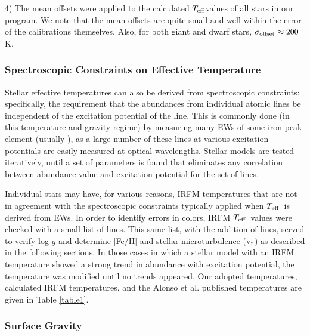 \documentclass[12pt,preprint]{aastex}
\def\teff{\mbox{$T_{\rm {eff}}$}}
\def\vt{\mbox{v$_{\rm t}$}}
\begin{document}
4) The mean offsets were applied to the calculated \teff values of all stars in our program.  We note that the mean offsets are quite small and well within the error of the calibrations themselves.  Also, for both giant and dwarf stars, $\sigma_{\rm{offset}} \approx 200$K.

\subsubsection{Spectroscopic Constraints on Effective Temperature}

Stellar effective temperatures can also be derived from spectroscopic constraints: specifically, the requirement that the abundances  from individual atomic lines be independent of the excitation potential of the line.  This is commonly done  (in this temperature and gravity regime) by measuring many EWs of  some iron peak element (usually ),  as a large number of these  lines at various excitation potentials are easily measured at optical wavelengths.  Stellar models are tested iteratively, until a set of parameters is found that eliminates any correlation between abundance value and excitation potential for the set of lines.  

Individual stars may have, for various reasons, IRFM temperatures that are not in agreement  with the spectroscopic constraints typically applied when \teff~is derived from EWs.  In order to identify errors in colors, IRFM \teff~values were checked with a small list of   lines.  This same list, with the addition of  lines, served to verify log $g$ and determine [Fe/H] and stellar microturbulence (\vt) as described in the following sections.  In those cases in which a stellar model with an IRFM temperature showed a strong trend in  abundance with excitation potential, the temperature was modified until no trends appeared.  Our adopted temperatures, calculated IRFM temperatures, and the Alonso et al. published temperatures are given in Table \ref{table1}.

\subsubsection{Surface Gravity \label{logg}}
\end{document}
